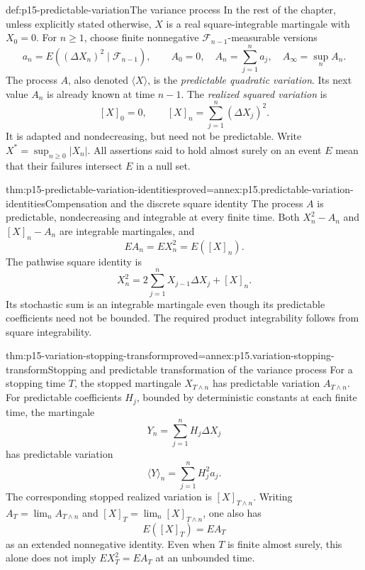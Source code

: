 \begin{hbdefinition}{def:p15-predictable-variation}{The variance process}
In the rest of the chapter, unless explicitly stated otherwise,
\(X\) is a real square-integrable martingale with \(X_0=0\).
For \(n\geq1\), choose finite nonnegative
\(\mathcal F_{n-1}\)-measurable versions
\[
 a_n=E((\Delta X_n)^2\mid\mathcal F_{n-1}),\qquad
 A_0=0,\quad A_n=\sum_{j=1}^na_j,\quad A_\infty=\sup_nA_n.
\]
The process \(A\), also denoted \(\langle X\rangle\), is the
\emph{predictable quadratic variation}. Its next value \(A_n\)
is already known at time \(n-1\).
The \emph{realized squared variation} is
\[
                  [X]_0=0,\qquad [X]_n=\sum_{j=1}^n(\Delta X_j)^2.
\]
It is adapted and nondecreasing, but need not be predictable.
Write \(X^*=\sup_{n\geq0}|X_n|\).
All assertions said to hold almost surely on an event \(E\)
mean that their failures intersect \(E\) in a null set.
\end{hbdefinition}

\begin{hbtheorem}{thm:p15-predictable-variation-identities}{proved=annex:p15.predictable-variation-identities}{Compensation and the discrete square identity}
The process \(A\) is predictable, nondecreasing and integrable
at every finite time. Both \(X_n^2-A_n\) and \([X]_n-A_n\)
are integrable martingales, and
\[
                 EA_n=EX_n^2=E([X]_n).
\]
The pathwise square identity is
\[
                 X_n^2=2\sum_{j=1}^nX_{j-1}\Delta X_j+[X]_n.
\]
Its stochastic sum is an integrable martingale even though its
predictable coefficients need not be bounded. The required product
integrability follows from square integrability.
\end{hbtheorem}

\begin{hbtheorem}{thm:p15-variation-stopping-transform}{proved=annex:p15.variation-stopping-transform}{Stopping and predictable transformation of the variance process}
For a stopping time \(T\), the stopped martingale \(X_{T\wedge n}\)
has predictable variation \(A_{T\wedge n}\).
For predictable coefficients \(H_j\), bounded by deterministic
constants at each finite time, the martingale
\[
                         Y_n=\sum_{j=1}^nH_j\Delta X_j
\]
has predictable variation
\[
                         \langle Y\rangle_n=\sum_{j=1}^nH_j^2a_j.
\]
The corresponding stopped realized variation is \([X]_{T\wedge n}\).
Writing \(A_T=\lim_nA_{T\wedge n}\) and
\([X]_T=\lim_n[X]_{T\wedge n}\), one also has
\[
                               E([X]_T)=EA_T
\]
as an extended nonnegative identity.
Even when \(T\) is finite almost surely, this alone does not
imply \(EX_T^2=EA_T\) at an unbounded time.
\end{hbtheorem}

